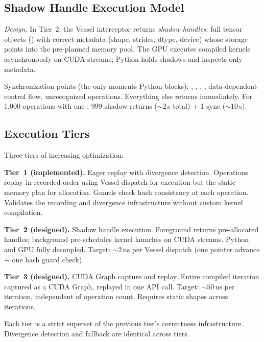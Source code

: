 \subsection{Shadow Handle Execution Model}

\emph{Design.}
In Tier~2, the Vessel interceptor returns \emph{shadow handles}: full tensor objects () with correct metadata (shape, strides, dtype, device) whose storage points into the pre-planned memory pool.
The GPU executes compiled kernels asynchronously on CUDA streams; Python holds shadows and inspects only metadata.

Synchronization points (the only moments Python blocks): , , , , data-dependent control flow, unrecognized operations.
Everything else returns immediately.
For 1,000 operations with one : 999 shadow returns (${\sim}2$\,\textmu{}s total) + 1 sync (${\sim}10$\,\textmu{}s).

\subsection{Execution Tiers}

Three tiers of increasing optimization:

\textbf{Tier~1 (implemented).}
Eager replay with divergence detection.
Operations replay in recorded order using Vessel dispatch for execution but the static memory plan for allocation.
Guards check hash consistency at each operation.
Validates the recording and divergence infrastructure without custom kernel compilation.

\textbf{Tier~2 (designed).}
Shadow handle execution.
Foreground returns pre-allocated handles; background pre-schedules kernel launches on CUDA streams.
Python and GPU fully decoupled.
Target: ${\sim}2$\,ns per Vessel dispatch (one pointer advance + one hash guard check).

\textbf{Tier~3 (designed).}
CUDA Graph capture and replay.
Entire compiled iteration captured as a CUDA Graph, replayed in one API call.
Target: ${\sim}50$\,ns per iteration, independent of operation count.
Requires static shapes across iterations.

Each tier is a strict superset of the previous tier's correctness infrastructure.
Divergence detection and fallback are identical across tiers.
